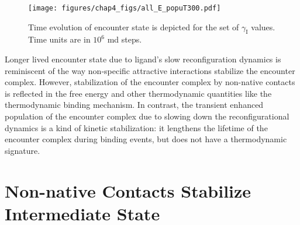 \documentclass[../talant.diss.submit.tex]{subfiles}
\begin{document}
\begin{figure}[htp!]                                                                                     
\begin{centering}                                                                                        
    \texttt{[image: figures/chap4\_figs/all\_E\_popuT300.pdf]}
    \caption{Time evolution of encounter state is depicted for the
      set of $\gamma_{\mathrm{I}}$ values. Time units are in $10^{6}$ md steps.}                    
\label{fig:all_E_popuT300}                                                                               
  \end{centering}
\end{figure}                                                                                                


%

Longer lived encounter state due to ligand's slow reconfiguration dynamics is reminiscent
of the way non-specific attractive interactions stabilize the encounter complex.\cite{huang:10a}
However, stabilization of the encounter complex by non-native contacts is reflected in the
free energy and other thermodynamic quantities like the thermodynamic binding mechanism.
In contrast, the transient enhanced population of the encounter complex due to slowing down
the reconfigurational dynamics is a kind of kinetic stabilization: it lengthens the
lifetime of the encounter complex during binding events, but does not have a thermodynamic
signature.

%
\section{\textbf{Non-native Contacts Stabilize Intermediate State}}\label{sect:non_native}
\end{document}
